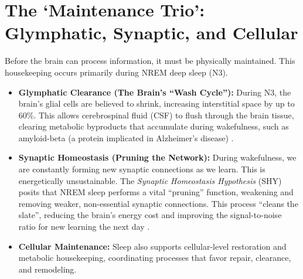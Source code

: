 \section{The `Maintenance Trio': Glymphatic, Synaptic, and Cellular}\label{sec:maintenance_trio}

Before the brain can process information, it must be physically maintained. This housekeeping occurs primarily during NREM deep sleep (N3).

\begin{itemize}
    \item \textbf{Glymphatic Clearance (The Brain's ``Wash Cycle''):} During N3, the brain's glial cells are believed to shrink, increasing interstitial space by up to 60\%. This allows cerebrospinal fluid (CSF) to flush through the brain tissue, clearing metabolic byproducts that accumulate during wakefulness, such as amyloid-beta (a protein implicated in Alzheimer's disease) \citep{benington1999, xie2023}.
    
    \item \textbf{Synaptic Homeostasis (Pruning the Network):} During wakefulness, we are constantly forming new synaptic connections as we learn. This is energetically unsustainable. The \textit{Synaptic Homeostasis Hypothesis} (SHY) posits that NREM sleep performs a vital ``pruning'' function, weakening and removing weaker, non-essential synaptic connections. This process ``cleans the slate'', reducing the brain's energy cost and improving the signal-to-noise ratio for new learning the next day \citep{price_of_plasticity2014}.
    
    \item \textbf{Cellular Maintenance:} Sleep also supports cellular-level restoration and metabolic housekeeping, coordinating processes that favor repair, clearance, and remodeling.
\end{itemize}

